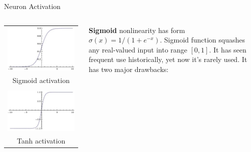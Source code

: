 \documentclass[aspectratio=169]{beamer}
\begin{document}

\begin{frame}{Neuron Activation}
\begin{columns}
\begin{column}{0.25\textwidth}
\begin{tabular}{c}
\\
\includegraphics[width=\textwidth]{img/cnn/act_sigmoid.jpg}\\
Sigmoid activation\\ \\
\includegraphics[width=\textwidth]{img/cnn/act_tanh.jpg}\\
Tanh activation
\end{tabular}
\end{column}
\begin{column}{0.7\textwidth}
\textbf{Sigmoid} nonlinearity has form $\sigma(x) = 1 / (1 + e^{-x})$. Sigmoid function squashes any real-valued input into range $[0, 1]$. It has seen frequent use historically, yet now it's rarely used. It has two major drawbacks:

\end{column}
\end{columns}
\end{frame}
\end{document}
